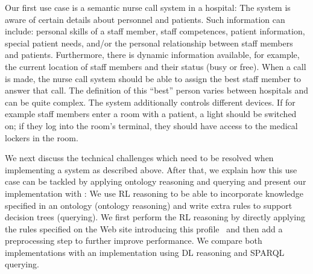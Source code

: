 
Our first use case is a semantic nurse call system in a hospital:
The system is aware of certain details about personnel and patients. %
Such information can include: personal skills of a staff member, staff competences, patient information, special patient needs, and/or the 
personal relationship between staff members and patients. 
Furthermore, there is dynamic information available, for example, the current location of staff members and their status (busy or free). 
When a call is made, the nurse
call system should be able to assign the best staff member to answer that call. The definition of this ``best'' person
varies between hospitals and can be quite complex. 
The system additionally controls different devices. If for example staff members enter a room with a patient, 
a light should be switched on; if they log into the room's terminal, they should have access to the medical lockers in the room. 


We next discuss the technical challenges which need to be resolved when implementing a system as described above. 
After that, we explain how this use case can be tackled by applying
ontology reasoning and querying and present our implementation 
with \nthreelogic:
We use \owl RL reasoning to be able to incorporate knowledge specified in an \owl ontology (ontology reasoning) and write extra rules to support decision 
trees (querying). We first perform the \owl RL reasoning by directly applying the rules specified on the Web site introducing this profile~\cite{OWLRL} and then add a preprocessing step to further improve performance.  
We compare both implementations with an implementation using \owl DL reasoning and SPARQL querying.


